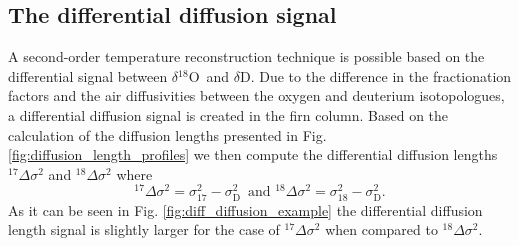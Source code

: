 \documentclass[11pt, draftcls, onecolumn]{IEEEtran} %
\numberwithin{equation}{section}
\numberwithin{table}{section}
\numberwithin{figure}{section}
\newcommand{\delOx}{$\delta{}^{18}\mathrm{O}$}
\newcommand{\delD}{$\delta\mathrm{D}$}
\begin{document}
%
%
%
%


\subsection{The differential diffusion signal}\label{sec:diff_diffusion}
A second-order temperature reconstruction technique is possible based on the differential signal between
\delOx~and \delD. Due to the difference in the fractionation factors and the air diffusivities between the oxygen and deuterium isotopologues,
a differential diffusion signal is created in the firn column. Based on the calculation of the diffusion lengths
presented in Fig. \ref{fig:diffusion_length_profiles} we then compute the differential diffusion lengths ${}^{17}\Delta\sigma^2$
and ${}^{18}\Delta\sigma^2$ where
\begin{equation}
{}^{17}\Delta\sigma^2 =  \sigma^2_{17} - \sigma^2_{\mathrm{D}} \mathrm{\,\,\,and\,\,}{}^{18}\Delta\sigma^2 =  \sigma^2_{18} - \sigma^2_{\mathrm{D}}.
\end{equation}
As it can be seen in Fig. \ref{fig:diff_diffusion_example} the differential diffusion length signal is slightly larger for the case 
of ${}^{17}\Delta\sigma^2$ when compared to  ${}^{18}\Delta\sigma^2$. 
\end{document}
